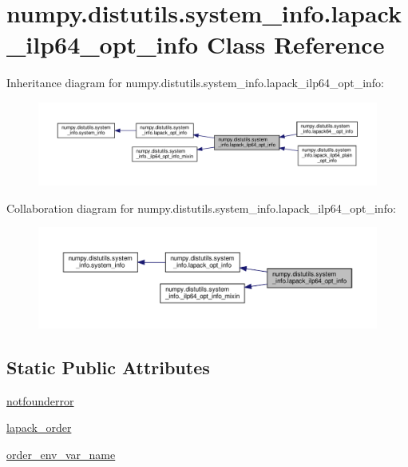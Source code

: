 \hypertarget{classnumpy_1_1distutils_1_1system__info_1_1lapack__ilp64__opt__info}{}\section{numpy.\+distutils.\+system\+\_\+info.\+lapack\+\_\+ilp64\+\_\+opt\+\_\+info Class Reference}
\label{classnumpy_1_1distutils_1_1system__info_1_1lapack__ilp64__opt__info}


Inheritance diagram for numpy.\+distutils.\+system\+\_\+info.\+lapack\+\_\+ilp64\+\_\+opt\+\_\+info\+:
\nopagebreak
\begin{figure}[H]
\begin{center}
\leavevmode
\includegraphics[width=350pt]{classnumpy_1_1distutils_1_1system__info_1_1lapack__ilp64__opt__info__inherit__graph}
\end{center}
\end{figure}


Collaboration diagram for numpy.\+distutils.\+system\+\_\+info.\+lapack\+\_\+ilp64\+\_\+opt\+\_\+info\+:
\nopagebreak
\begin{figure}[H]
\begin{center}
\leavevmode
\includegraphics[width=350pt]{classnumpy_1_1distutils_1_1system__info_1_1lapack__ilp64__opt__info__coll__graph}
\end{center}
\end{figure}
\subsection*{Static Public Attributes}
\begin{DoxyCompactItemize}
\item 
\hyperlink{classnumpy_1_1distutils_1_1system__info_1_1lapack__ilp64__opt__info_ad428a818a3eea9780e419dbacb5a1a48}{notfounderror}
\item 
\hyperlink{classnumpy_1_1distutils_1_1system__info_1_1lapack__ilp64__opt__info_a5fe089411a12f2660fe472601c7ac17e}{lapack\+\_\+order}
\item 
\hyperlink{classnumpy_1_1distutils_1_1system__info_1_1lapack__ilp64__opt__info_a703ee93a0d25ca5a66d9c69418cb1d93}{order\+\_\+env\+\_\+var\+\_\+name}
\end{DoxyCompactItemize}
